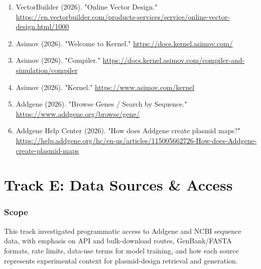 \documentclass[11pt]{report}
\begin{document}
\begin{enumerate}
\item VectorBuilder (2026). "Online Vector Design." \url{https://en.vectorbuilder.com/products-services/service/online-vector-design.html/1000}
\item Asimov (2026). "Welcome to Kernel." \url{https://docs.kernel.asimov.com/}
\item Asimov (2026). "Compiler." \url{https://docs.kernel.asimov.com/compiler-and-simulation/compiler}
\item Asimov (2026). "Kernel." \url{https://www.asimov.com/kernel}
\item Addgene (2026). "Browse Genes / Search by Sequence." \url{https://www.addgene.org/browse/gene/}
\item Addgene Help Center (2026). "How does Addgene create plasmid maps?" \url{https://help.addgene.org/hc/en-us/articles/115005662726-How-does-Addgene-create-plasmid-maps}
\end{enumerate}

\chapter{Track E: Data Sources \& Access}

\subsection{Scope}
This track investigated programmatic access to Addgene and NCBI sequence data, with emphasis on API and bulk-download routes, GenBank/FASTA formats, rate limits, data-use terms for model training, and how each source represents experimental context for plasmid-design retrieval and generation.\par
\end{document}
